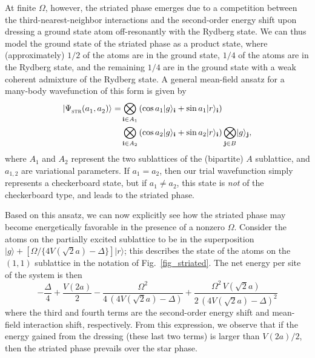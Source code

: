 \documentclass[reprint,twocolumn,secnumarabic,amssymb, aps, prl]{revtex4-1}
\begin{document}
At finite $\Omega$, however, the striated phase emerges due to a competition between the third-nearest-neighbor interactions and the second-order energy shift upon dressing a ground state atom off-resonantly with the Rydberg state. We can thus model the ground state of the striated phase as a product state, where (approximately) $1/2$ of the atoms are in the ground state, $1/4$ of the atoms are in the Rydberg state, and the remaining $1/4$ are in the ground state with a weak coherent admixture of the Rydberg state. A general mean-field ansatz for a many-body wavefunction of this form is given by
\begin{alignat}{1}
\rvert \Psi^{}_\textsc{str} (a_1^{}, a^{}_2) \rangle = &\bigotimes_{\mathbf{i} \in A_1} \left ( \cos a_1 \rvert g \rangle_\mathbf{i} + \sin a_1 \rvert r \rangle_\mathbf{i} \right)\\
\nonumber&\bigotimes_{\mathbf{i} \in A_2} \left ( \cos a_2 \rvert g \rangle_\mathbf{i} + \sin a_2 \rvert r \rangle_\mathbf{i} \right) \bigotimes_{\mathbf{j} \in B} \rvert g \rangle_\mathbf{j},
\end{alignat}
where $A_1$ and $A_2$ represent the two sublattices of the (bipartite) $A$ sublattice, and $a_{1,2}$ are variational parameters. If $a_1=a_2$, then our trial wavefunction simply represents a checkerboard state, but if $a_1\ne a_2$, this state is \textit{not} of
the checkerboard type, and leads to the striated phase.

Based on this ansatz, we can now explicitly see how the striated phase may become energetically favorable in the presence of a nonzero $\Omega$. Consider the atoms on the partially excited sublattice to be in the superposition $\rvert g \rangle + [\Omega/\{4V(\sqrt{2}a)-\Delta \}]\rvert r \rangle$; this describes the state of the atoms on the $(1,1)$ sublattice in the notation of Fig.~\ref{fig_striated}. The net energy per site of the system is then
\begin{equation*}
-\frac{\Delta}{4} + \frac{V(2a)}{2} -\frac{\Omega^2}{ 4\,(4V(\sqrt{2}a) -\Delta)} +\frac{\Omega^2\, V(\sqrt{2}a)}{ 2\,(4V(\sqrt{2}a) -\Delta)^2}
\end{equation*}
where the third and fourth terms are the second-order energy shift and mean-field interaction shift, respectively.
From this expression, we observe that if the energy gained from the dressing (these last two terms) is larger than $V(2a)/2$, then the striated phase prevails over the star phase.\\
\end{document}
